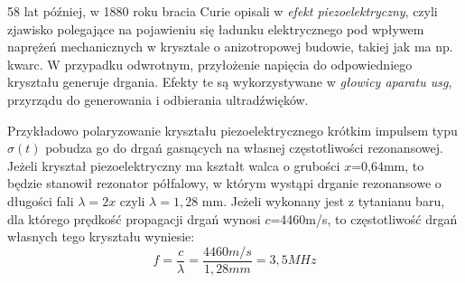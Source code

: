58 lat później, w 1880 roku bracia Curie opisali w \cite{Curie1880} \textit{efekt piezoelektryczny}, czyli zjawisko polegające na pojawieniu się ładunku elektrycznego pod wpływem naprężeń mechanicznych w krysztale o anizotropowej budowie, takiej jak ma np. kwarc. W przypadku odwrotnym, przyłożenie napięcia do odpowiedniego kryształu generuje drgania. Efekty te są wykorzystywane w \textit{głowicy aparatu usg}, przyrządu do generowania i odbierania ultradźwięków. 

Przykładowo polaryzowanie kryształu piezoelektrycznego krótkim impulsem typu $\sigma(t)$ pobudza go do drgań gasnących na własnej częstotliwości rezonansowej. Jeżeli kryształ piezoelektryczny ma kształt walca o grubości $x$=0,64mm, to będzie stanowił rezonator półfalowy, w którym wystąpi drganie rezonansowe o długości fali $\lambda = 2x$ czyli $\lambda = 1,28$ mm. Jeżeli wykonany jest z tytanianu baru, dla którego prędkość propagacji drgań wynosi $c$=4460m/s, to częstotliwość drgań własnych tego
kryształu wyniesie:
\begin{equation}
f = \frac{c}{\lambda} = \frac{4460 m/s}{1,28 mm} = 3,5 MHz
\end{equation}

